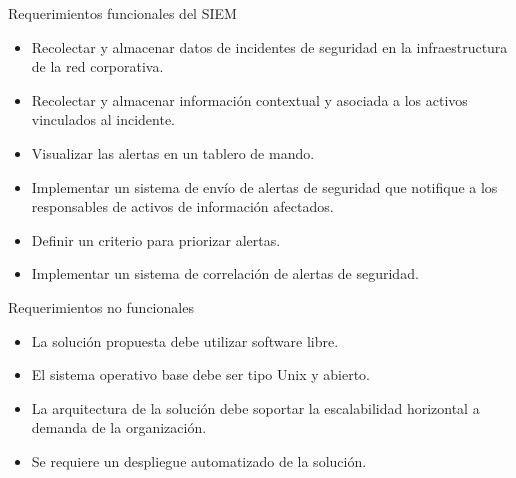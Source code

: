     \begin{section}{Requerimientos funcionales del SIEM}
    \begin{itemize}
        \item Recolectar y almacenar datos de incidentes de seguridad en la infraestructura de la red corporativa.
        \item Recolectar y almacenar información contextual y asociada a los activos vinculados  al incidente.
        \item Visualizar las alertas en un tablero de mando. 
        \item Implementar un sistema de envío de alertas de seguridad que notifique a los responsables de activos de información afectados.
        \item Definir un criterio para priorizar alertas.
        \item Implementar un sistema de correlación de alertas de seguridad.
    \end{itemize}
    \end{section}
    \vspace{1cm}
    \begin{section}{Requerimientos no funcionales}
    \begin{itemize}
        \item La solución propuesta debe utilizar software libre.
        \item El sistema operativo base debe ser tipo Unix y abierto.
        \item La arquitectura de la solución debe soportar la escalabilidad horizontal a demanda de la organización.
        \item Se requiere un despliegue automatizado de la solución.
    \end{itemize}
    \end{section}
    
